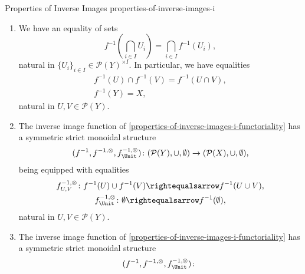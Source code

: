\begin{proposition}{Properties of Inverse Images \rmI}{properties-of-inverse-images-i}
\begin{enumerate}
\[\begin{gathered}
                    f^{-1}(\emptyset)                        = \emptyset,
                \end{gathered}
            \]%
            natural in $U,V\in\mathcal{P}(Y)$.
        \item\label{properties-of-inverse-images-i-preservation-of-limits}We have an equality of sets
            \[
                    f^{-1}\left(\bigcap_{i\in I}U_{i}\right)%
                    =%
                    \bigcap_{i\in I}f^{-1}(U_{i}),%
            \]%
            natural in $\{U_{i}\}_{i\in I}\in\mathcal{P}(Y)^{\times I}$. In particular, we have equalities%
            \[
                \begin{gathered}
                    f^{-1}(U)\cap f^{-1}(V)                  = f^{-1}(U\cap V),\\
                    f^{-1}(Y)                                = X,
                \end{gathered}
            \]%
            natural in $U,V\in\mathcal{P}(Y)$.
        \item\label{properties-of-inverse-images-i-symmetric-strict-monoidality-with-respect-to-unions}The inverse image function of \cref{properties-of-inverse-images-i-functoriality} has a symmetric strict monoidal structure
            \[
                (f^{-1},f^{-1,\otimes},f^{-1,\otimes}_{\Unit})
                \colon
                (\mathcal{P}(Y),\cup,\emptyset)
                \to
                (\mathcal{P}(X),\cup,\emptyset),
            \]%
            being equipped with equalities%
            \[
                \begin{gathered}
                    f^{-1,\otimes}_{U,V}   \colon f^{-1}(U)\cup f^{-1}(V) \rightequalsarrow f^{-1}(U\cup V),\\
                    f^{-1,\otimes}_{\Unit} \colon \emptyset               \rightequalsarrow f^{-1}(\emptyset),
                \end{gathered}
            \]%
            natural in $U,V\in\mathcal{P}(Y)$.
        \item\label{properties-of-inverse-images-i-symmetric-strict-monoidality-with-respect-to-intersections}The inverse image function of \cref{properties-of-inverse-images-i-functoriality} has a symmetric strict monoidal structure
            \[
                (f^{-1},f^{-1,\otimes},f^{-1,\otimes}_{\Unit})
                \colon
\]
\end{enumerate}
\end{proposition}
